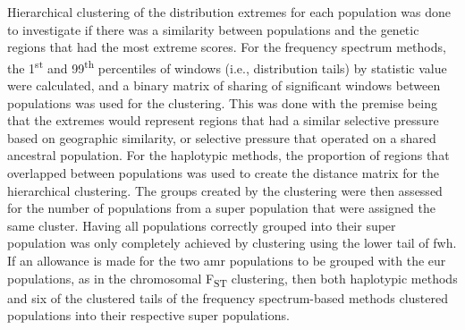 \documentclass[twoside,openright]{report}
\begin{document}
Hierarchical clustering of the distribution extremes for each population
was done to investigate if there was a similarity between populations
and the genetic regions that had the most extreme scores. For the
frequency spectrum methods, the 1\textsuperscript{st} and
99\textsuperscript{th} percentiles of windows (i.e., distribution tails)
by statistic value were calculated, and a binary matrix of sharing of
significant windows between populations was used for the clustering.
This was done with the premise being that the extremes would represent
regions that had a similar selective pressure based on geographic
similarity, or selective pressure that operated on a shared ancestral
population. For the haplotypic methods, the proportion of regions that
overlapped between populations was used to create the distance matrix
for the hierarchical clustering. The groups created by the clustering
were then assessed for the number of populations from a super population
that were assigned the same cluster. Having all populations correctly
grouped into their super population was only completely achieved by
clustering using the lower tail of \gls{fwh}. If an allowance is made
for the two \gls{amr} populations to be grouped with the \gls{eur}
populations, as in the chromosomal F\textsubscript{ST} clustering, then
both haplotypic methods and six of the clustered tails of the frequency
spectrum-based methods clustered populations into their respective super
populations.
\end{document}
